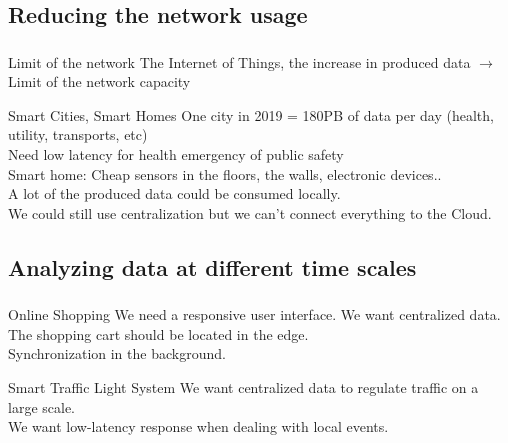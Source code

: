 \documentclass[utf8,xcolor=table, page number]{earlywinter}
\begin{document}
\subsection{Reducing the network usage}
\begin{frame}
  \frametitle{\secname}
  \framesubtitle{\subsecname}

  \begin{alertblock}{Limit of the network}
    The Internet of Things, the increase in produced data $\to$ Limit of the network capacity
  \end{alertblock}

  \begin{exampleblock}{Smart Cities, Smart Homes}
    One city in 2019 = 180PB of data per day (health, utility, transports, etc)\\
    Need low latency for health emergency of public safety \\
    Smart home: Cheap sensors in the floors, the walls, electronic devices..\\
    A lot of the produced data could be consumed locally.\\
    We could still use centralization but we can't connect everything to the Cloud.
  \end{exampleblock}
  
\end{frame}


\subsection{Analyzing data at different time scales}
\begin{frame}
  \frametitle{\secname}
  \framesubtitle{\subsecname}

  \begin{exampleblock}{Online Shopping}
    We need a responsive user interface. We want centralized data.\\
    The shopping cart should be located in the edge.\\
    Synchronization in the background.
  \end{exampleblock}


  \begin{exampleblock}{Smart Traffic Light System}
    We want centralized data to regulate traffic on a large scale.\\
    We want low-latency response when dealing with local events.

  \end{exampleblock}
  
%  
\end{frame}
\end{document}
